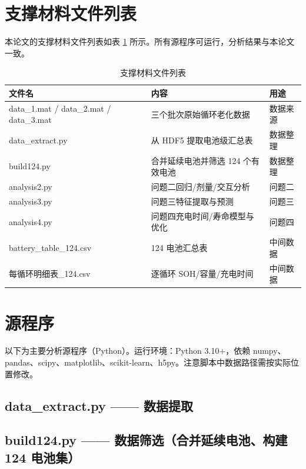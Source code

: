 \documentclass[withoutpreface]{cumcmthesis}
\begin{document}
\begin{appendices}

\section{支撑材料文件列表}

本论文的支撑材料文件列表如表 \ref{tab:support} 所示。所有源程序可运行，分析结果与本论文一致。

\begin{table}[htbp]
\centering
\caption{支撑材料文件列表}
\label{tab:support}
\begin{tabular}{lll}
\toprule
文件名 & 内容 & 用途 \\
\midrule
data\_1.mat / data\_2.mat / data\_3.mat & 三个批次原始循环老化数据 & 数据来源 \\
data\_extract.py & 从 HDF5 提取电池级汇总表 & 数据整理 \\
build124.py & 合并延续电池并筛选 124 个有效电池 & 数据整理 \\
analysis2.py & 问题二回归/剂量/交互分析 & 问题二 \\
analysis3.py & 问题三特征提取与预测 & 问题三 \\
analysis4.py & 问题四充电时间/寿命模型与优化 & 问题四 \\
battery\_table\_124.csv & 124 电池汇总表 & 中间数据 \\
每循环明细表\_124.csv & 逐循环 SOH/容量/充电时间 & 中间数据 \\
\bottomrule
\end{tabular}
\end{table}

\section{源程序}

以下为主要分析源程序（Python）。运行环境：Python 3.10+，依赖 numpy、pandas、scipy、matplotlib、scikit-learn、h5py。注意脚本中数据路径需按实际位置修改。

\subsection{data\_extract.py —— 数据提取}


\subsection{build124.py —— 数据筛选（合并延续电池、构建 124 电池集）}



\end{appendices}
\end{document}
